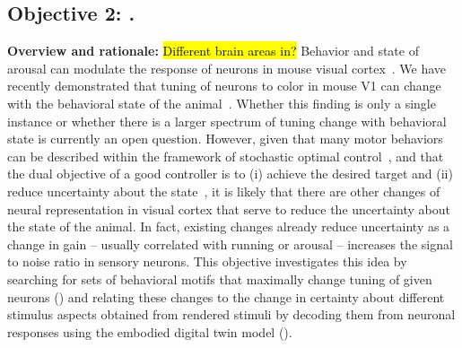 \documentclass[B2,COG]{ercgrant}
\begin{document}
\subsection{\colorbox{obj2}{\color{white}Objective 2}: \otwotitle.}

\label{sub:obj2}

\textbf{Overview and rationale:} 
\hl{Different brain areas in?}
Behavior and state of arousal can modulate the response of neurons in mouse visual cortex~\parencite{Niell2010-bs, Stringer2019-lt, Musall2019-kd}.
We have recently demonstrated that tuning of neurons to color in mouse V1 can change with the behavioral state of the animal~\parencite{Franke2022-do}.
Whether this finding is only a single instance or whether there is a larger spectrum of tuning change with behavioral state is currently an open question. 
However, given that many motor behaviors can be described within the framework of stochastic optimal control~\parencite{Todorov2004-yb}, and that the dual objective of a good controller is to (i) achieve the desired target and (ii) reduce uncertainty about the state~\parencite{Patchell1971-zk}, it is likely that there are other changes of neural representation in visual cortex that serve to reduce the uncertainty about the state of the animal. 
In fact, existing changes already reduce uncertainty as a change in gain -- usually correlated with running or arousal -- increases the signal to noise ratio in sensory neurons. 
This objective investigates this idea by searching for sets of behavioral motifs that maximally change tuning of given neurons () and relating these changes to the change in certainty about different stimulus aspects obtained from rendered stimuli by decoding them from neuronal responses using the embodied digital twin model ().




\end{document}
